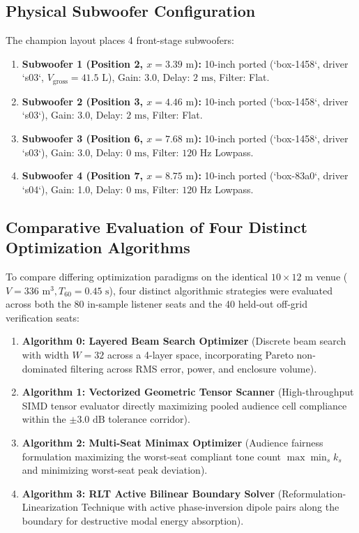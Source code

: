 \documentclass[11pt,a4paper]{article}
\begin{document}
\subsection{Physical Subwoofer Configuration}
The champion layout places 4 front-stage subwoofers:
\begin{enumerate}
    \item \textbf{Subwoofer 1 (Position 2, $x = 3.39\text{ m}$):} 10-inch ported (`box-1458`, driver `s03`, $V_{\text{gross}} = 41.5\text{ L}$), Gain: 3.0, Delay: $2\text{ ms}$, Filter: Flat.
    \item \textbf{Subwoofer 2 (Position 3, $x = 4.46\text{ m}$):} 10-inch ported (`box-1458`, driver `s03`), Gain: 3.0, Delay: $2\text{ ms}$, Filter: Flat.
    \item \textbf{Subwoofer 3 (Position 6, $x = 7.68\text{ m}$):} 10-inch ported (`box-1458`, driver `s03`), Gain: 3.0, Delay: $0\text{ ms}$, Filter: $120\text{ Hz}$ Lowpass.
    \item \textbf{Subwoofer 4 (Position 7, $x = 8.75\text{ m}$):} 10-inch ported (`box-83a0`, driver `s04`), Gain: 1.0, Delay: $0\text{ ms}$, Filter: $120\text{ Hz}$ Lowpass.
\end{enumerate}

\subsection{Comparative Evaluation of Four Distinct Optimization Algorithms}

To compare differing optimization paradigms on the identical $10 \times 12\text{ m}$ venue ($V = 336\text{ m}^3, T_{60} = 0.45\text{ s}$), four distinct algorithmic strategies were evaluated across both the 80 in-sample listener seats and the 40 held-out off-grid verification seats:
\begin{enumerate}
    \item \textbf{Algorithm 0: Layered Beam Search Optimizer} (Discrete beam search with width $W=32$ across a 4-layer space, incorporating Pareto non-dominated filtering across RMS error, power, and enclosure volume).
    \item \textbf{Algorithm 1: Vectorized Geometric Tensor Scanner} (High-throughput SIMD tensor evaluator directly maximizing pooled audience cell compliance within the $\pm 3.0\text{ dB}$ tolerance corridor).
    \item \textbf{Algorithm 2: Multi-Seat Minimax Optimizer} (Audience fairness formulation maximizing the worst-seat compliant tone count $\max \min_s k_s$ and minimizing worst-seat peak deviation).
    \item \textbf{Algorithm 3: RLT Active Bilinear Boundary Solver} (Reformulation-Linearization Technique with active phase-inversion dipole pairs along the boundary for destructive modal energy absorption).
\end{enumerate}
\end{document}
